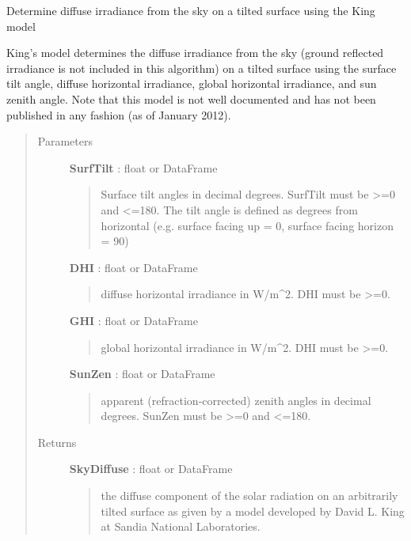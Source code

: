 \documentclass[letterpaper,10pt,english]{sphinxmanual}
\begin{document}
\begin{fulllineitems}
\label{stubs/pvlib.pvl_kingdiffuse:pvlib.pvl_kingdiffuse}
Determine diffuse irradiance from the sky on a tilted surface using the King model

King's model determines the diffuse irradiance from the sky
(ground reflected irradiance is not included in this algorithm) on a
tilted surface using the surface tilt angle, diffuse horizontal
irradiance, global horizontal irradiance, and sun zenith angle. Note
that this model is not well documented and has not been published in
any fashion (as of January 2012).
\begin{quote}\begin{description}
\item[{Parameters}] \leavevmode
\textbf{SurfTilt} : float or DataFrame
\begin{quote}

Surface tilt angles in decimal degrees.
SurfTilt must be \textgreater{}=0 and \textless{}=180. The tilt angle is defined as
degrees from horizontal (e.g. surface facing up = 0, surface facing
horizon = 90)
\end{quote}

\textbf{DHI} : float or DataFrame
\begin{quote}

diffuse horizontal irradiance in W/m\textasciicircum{}2. 
DHI must be \textgreater{}=0.
\end{quote}

\textbf{GHI} : float or DataFrame
\begin{quote}

global horizontal irradiance in W/m\textasciicircum{}2. 
DHI must be \textgreater{}=0.
\end{quote}

\textbf{SunZen} : float or DataFrame
\begin{quote}

apparent (refraction-corrected) zenith
angles in decimal degrees. 
SunZen must be \textgreater{}=0 and \textless{}=180.
\end{quote}

\item[{Returns}] \leavevmode
\textbf{SkyDiffuse} : float or DataFrame
\begin{quote}

the diffuse component of the solar radiation  on an
arbitrarily tilted surface as given by a model developed by David L.
King at Sandia National Laboratories.
\end{quote}


\end{description}
\end{quote}
\end{fulllineitems}
\end{document}
